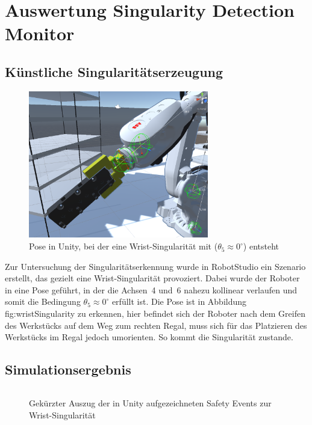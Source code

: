 \newpage
\section{Auswertung Singularity Detection Monitor}
\label{sec:singularityauswertung}

\subsection{Künstliche Singularitätserzeugung}
\begin{figure}[H]
	\centering
	\includegraphics[width=0.7\textwidth]{figures/wristSingularity.png}
	\caption{Pose in Unity, bei der eine Wrist-Singularität mit ($\theta_{5} \approx 0^\circ$) entsteht}
	\label{fig:wristSingularity}
\end{figure}

Zur Untersuchung der Singularitätserkennung wurde in RobotStudio ein Szenario erstellt,
das gezielt eine Wrist-Singularität provoziert. Dabei wurde der Roboter in eine Pose
geführt, in der die Achsen~4 und~6 nahezu kollinear verlaufen und somit die Bedingung
$\theta_{5} \approx 0^\circ$ erfüllt ist. Die Pose ist in Abbildung
	{fig:wristSingularity} zu erkennen, hier befindet sich der Roboter nach dem
Greifen des Werkstücks auf dem Weg zum rechten Regal, muss sich für das
Platzieren des Werkstücks im Regal jedoch umorienten. So kommt die Singularität
zustande.

\subsection{Simulationsergebnis}
\begin{figure}[H]
	\inputminted[fontsize=\footnotesize,breaklines]{json}{code-snippets/singularityerror.json}
	\caption{Gekürzter Auszug der in Unity aufgezeichneten Safety Events zur Wrist-Singularität}
	\label{lst:singularity_json}
\end{figure}

